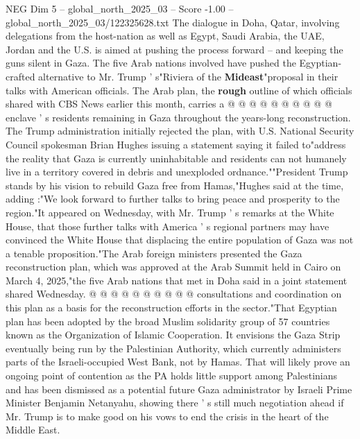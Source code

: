 \begin{textsample}{NEG Dim 5 – global\_north\_2025\_03 – Score -1.00 – global\_north\_2025\_03/122325628.txt}
The dialogue in Doha, Qatar, involving delegations from the host-nation as well as Egypt, Saudi Arabia, the UAE, Jordan and the U.S. is aimed at pushing the process forward -- and keeping the guns silent in Gaza.
The five Arab nations involved have pushed the Egyptian-crafted alternative to Mr.
Trump ' s"Riviera of the \textbf{Mideast}"proposal in their talks with American officials.
The Arab plan, the \textbf{rough} outline of which officials shared with CBS News earlier this month, carries a @ @ @ @ @ @ @ @ @ @ enclave ' s residents remaining in Gaza throughout the years-long reconstruction.
The Trump administration initially rejected the plan, with U.S.
National Security Council spokesman Brian Hughes issuing a statement saying it failed to"address the reality that Gaza is currently uninhabitable and residents can not humanely live in a territory covered in debris and unexploded ordnance.""President Trump stands by his vision to rebuild Gaza free from Hamas,"Hughes said at the time, adding :"We look forward to further talks to bring peace and prosperity to the region."It appeared on Wednesday, with Mr.
Trump ' s remarks at the White House, that those further talks with America ' s regional partners may have convinced the White House that displacing the entire population of Gaza was not a tenable proposition."The Arab foreign ministers presented the Gaza reconstruction plan, which was approved at the Arab Summit held in Cairo on March 4, 2025,"the five Arab nations that met in Doha said in a joint statement shared Wednesday. @ @ @ @ @ @ @ @ @ @ consultations and coordination on this plan as a basis for the reconstruction efforts in the sector."That Egyptian plan has been adopted by the broad Muslim solidarity group of 57 countries known as the Organization of Islamic Cooperation.
It envisions the Gaza Strip eventually being run by the Palestinian Authority, which currently administers parts of the Israeli-occupied West Bank, not by Hamas.
That will likely prove an ongoing point of contention as the PA holds little support among Palestinians and has been dismissed as a potential future Gaza administrator by Israeli Prime Minister Benjamin Netanyahu, showing there ' s still much negotiation ahead if Mr.
Trump is to make good on his vows to end the crisis in the heart of the Middle East.

\end{textsample}
